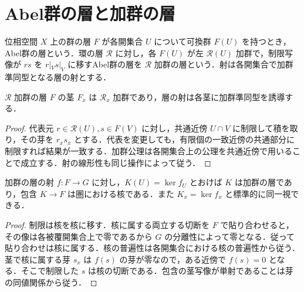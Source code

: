 \section{Abel群の層と加群の層}
\begin{defn}[Abel群の層と加群の層]
位相空間 $X$ 上の群の層 $F$ が各開集合 $U$ について可換群 $F(U)$ を持つとき，Abel群の層という．環の層 $\mathcal R$ に対し，各 $F(U)$ が左 $\mathcal R(U)$ 加群で，制限写像が $r s$ を $r|_V s|_V$ に移すAbel群の層を $\mathcal R$ 加群の層という．射は各開集合で加群準同型となる層の射とする．
\end{defn}
\begin{prop}[加群の層の茎]
$\mathcal R$ 加群の層 $F$ の茎 $F_x$ は $\mathcal R_x$ 加群であり，層の射は各茎に加群準同型を誘導する．
\end{prop}
\begin{proof}
代表元 $r\in\mathcal R(U),s\in F(V)$ に対し，共通近傍 $U\cap V$ に制限して積を取り，その芽を $r_xs_x$ とする．代表を変更しても，有限個の一致近傍の共通部分に制限すれば結果が一致する．加群公理は各開集合上の公理を共通近傍で用いることで成立する．射の線形性も同じ操作によって従う．
\end{proof}
\begin{prop}[層の核]
加群の層の射 $f:F\to G$ に対し，$K(U)=\ker f_U$ とおけば $K$ は加群の層であり，包含 $K\to F$ は圏における核である．また $K_x=\ker f_x$ と標準的に同一視できる．
\end{prop}
\begin{proof}
制限は核を核に移す．核に属する両立する切断を $F$ で貼り合わせると，その像は各被覆開集合上で零であるから $G$ の分離性によって零となる．従って貼り合わせは核に属する．核の普遍性は各開集合における核の普遍性から従う．茎で核に属する芽 $s_x$ は $f(s)$ の芽が零なので，ある近傍で $f(s)=0$ となる．そこで制限した $s$ は核の切断である．包含の茎写像が単射であることは芽の同値関係から従う．
\end{proof}
